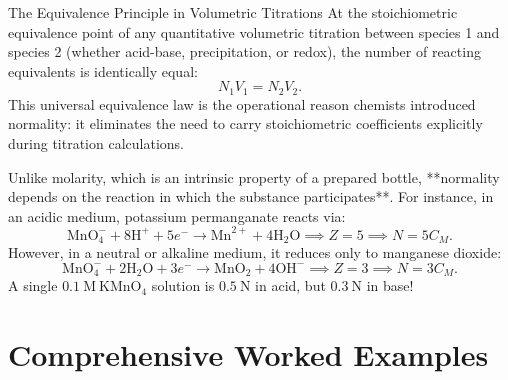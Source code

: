 \begin{lawbox}{The Equivalence Principle in Volumetric Titrations}
At the stoichiometric equivalence point of any quantitative volumetric titration between species 1 and species 2 (whether acid-base, precipitation, or redox), the number of reacting equivalents is identically equal:
\begin{equation}
N_1 V_1 = N_2 V_2.
\end{equation}
This universal equivalence law is the operational reason chemists introduced normality: it eliminates the need to carry stoichiometric coefficients explicitly during titration calculations.
\end{lawbox}

\begin{cautionbox}
Unlike molarity, which is an intrinsic property of a prepared bottle, **normality depends on the reaction in which the substance participates**. For instance, in an acidic medium, potassium permanganate reacts via:
\[
\mathrm{MnO_4^-} + 8\mathrm{H}^+ + 5e^- \longrightarrow \mathrm{Mn}^{2+} + 4\mathrm{H_2O} \implies Z = 5 \implies N = 5 C_M.
\]
However, in a neutral or alkaline medium, it reduces only to manganese dioxide:
\[
\mathrm{MnO_4^-} + 2\mathrm{H_2O} + 3e^- \longrightarrow \mathrm{MnO_2} + 4\mathrm{OH}^- \implies Z = 3 \implies N = 3 C_M.
\]
A single $0.1\ \mathrm{M}\ \mathrm{KMnO_4}$ solution is $0.5\ \mathrm{N}$ in acid, but $0.3\ \mathrm{N}$ in base!
\end{cautionbox}

\section{Comprehensive Worked Examples}

